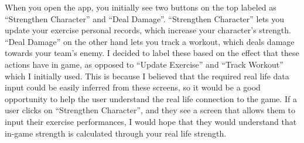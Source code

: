 \documentclass{l4proj}
\begin{document}
When you open the app, you initially see two buttons on the top labeled as ``Strengthen Character'' and ``Deal Damage''. ``Strengthen Character'' lets you update your exercise personal records, which increase your character's strength. ``Deal Damage'' on the other hand lets you track a workout, which deals damage towards your team's enemy. I decided to label these based on the effect that these actions have in game, as opposed to ``Update Exercise'' and ``Track Workout'' which I initially used. This is because I believed that the required real life data input could be easily inferred from these screens, so it would be a good opportunity to help the user understand the real life connection to the game. If a user clicks on ``Strengthen Character'', and they see a screen that allows them to input their exercise performances, I would hope that they would understand that in-game strength is calculated through your real life strength. 
\end{document}
